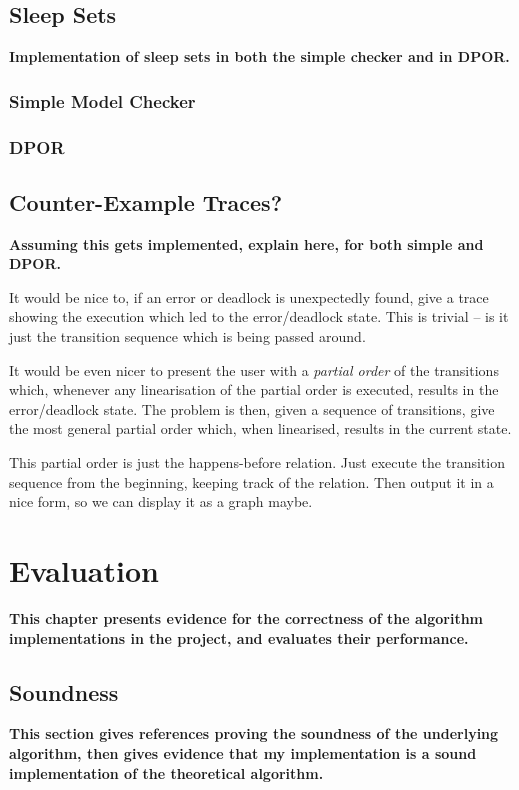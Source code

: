 \documentclass[12pt,a4paper,twoside,openright]{report}
\begin{document}
\section{Sleep Sets}
\textbf{Implementation of sleep
	sets in both the simple checker
	and in DPOR.}
\subsection{Simple Model Checker}
\subsection{DPOR}

\section{Counter-Example Traces?}
\textbf{Assuming this gets implemented,
	explain here, for both simple and DPOR.}

It would be nice to, if an error or deadlock
is unexpectedly found, give a trace showing
the execution which led to the error/deadlock
state. This is trivial -- is it just the
transition sequence which is being passed around.

It would be even nicer to present the user with
a \emph{partial order} of the transitions which,
whenever any linearisation of the partial order
is executed, results in the error/deadlock state.
The problem is then, given a sequence of
transitions, give the most general partial order
which, when linearised, results in the current
state.

This partial order is just the happens-before
relation. Just execute the transition sequence
from the beginning, keeping track of the relation.
Then output it in a nice form, so we can display it
as a graph maybe.

\chapter{Evaluation}
\textbf{This chapter presents evidence
	for the correctness of the
	algorithm implementations in the
	project, and evaluates their
	performance.}

\section{Soundness}
\textbf{This section gives references
	proving the soundness of the underlying
	algorithm, then gives evidence that my
	implementation is a sound implementation
	of the theoretical algorithm.}
\end{document}
